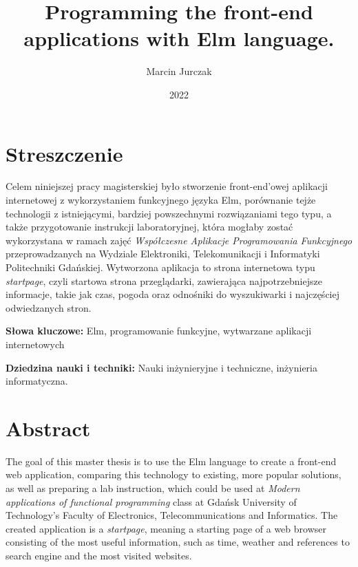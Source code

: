 \documentclass[twoside,a4paper]{report}
\begin{document}


\title{Programming the front-end applications with Elm language.}
\author{Marcin Jurczak}
\date{2022}

\maketitle


\chapter*{Streszczenie}
\noindent
Celem niniejszej pracy magisterskiej było stworzenie front-end'owej aplikacji internetowej z wykorzystaniem funkcyjnego języka Elm, porównanie tejże technologii z istniejącymi, bardziej powszechnymi rozwiązaniami tego typu, a także przygotowanie instrukcji laboratoryjnej, która mogłaby zostać wykorzystana w ramach zajęć \textit{Współczesne Aplikacje Programowania Funkcyjnego} przeprowadzanych na Wydziale Elektroniki, Telekomunikacji i Informatyki Politechniki Gdańskiej. Wytworzona aplikacja to strona internetowa typu \textit{startpage}, czyli startowa strona przeglądarki, zawierająca najpotrzebniejsze informacje, takie jak czas, pogoda oraz odnośniki do wyszukiwarki i najczęściej odwiedzanych stron.

\textbf{Słowa kluczowe:} Elm, programowanie funkcyjne, wytwarzane aplikacji internetowych

\textbf{Dziedzina nauki i techniki: }Nauki inżynieryjne i techniczne, inżynieria informatyczna.

{\let\clearpage\relax\chapter*{Abstract}}
\noindent
The goal of this master thesis is to use the Elm language to create a front-end web application, comparing this technology to existing, more popular solutions, as well as preparing a lab instruction, which could be used at \textit{Modern applications of functional programming} class at Gdańsk University of Technology’s Faculty of Electronics, Telecommunications and Informatics. The created application is a \textit{startpage}, meaning a starting page of a web browser consisting of the most useful information, such as time, weather and references to search engine and the most visited websites.
\end{document}
